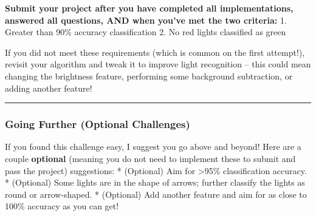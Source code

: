 \documentclass[11pt]{article}
\begin{document}
\textbf{Submit your project after you have completed all
implementations, answered all questions, AND when you've met the two
criteria:} 1. Greater than 90\% accuracy classification 2. No red lights
classified as green

If you did not meet these requirements (which is common on the first
attempt!), revisit your algorithm and tweak it to improve light
recognition -- this could mean changing the brightness feature,
performing some background subtraction, or adding another feature!

\begin{center}\rule{0.5\linewidth}{\linethickness}\end{center}

    \hypertarget{going-further-optional-challenges}{%
\subsubsection{Going Further (Optional
Challenges)}\label{going-further-optional-challenges}}

If you found this challenge easy, I suggest you go above and beyond!
Here are a couple \textbf{optional} (meaning you do not need to
implement these to submit and pass the project) suggestions: *
(Optional) Aim for \textgreater{}95\% classification accuracy. *
(Optional) Some lights are in the shape of arrows; further classify the
lights as round or arrow-shaped. * (Optional) Add another feature and
aim for as close to 100\% accuracy as you can get!


    
    
    
    
\end{document}
